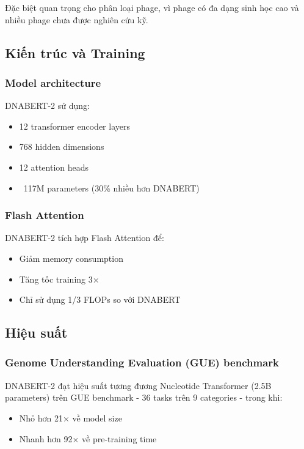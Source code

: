 Đặc biệt quan trọng cho phân loại phage, vì phage có đa dạng sinh học cao và nhiều phage chưa được nghiên cứu kỹ.

\subsection{Kiến trúc và Training}

\subsubsection{Model architecture}

DNABERT-2 sử dụng:
\begin{itemize}
    \item 12 transformer encoder layers
    \item 768 hidden dimensions
    \item 12 attention heads
    \item ~117M parameters (30\% nhiều hơn DNABERT)
\end{itemize}

\subsubsection{Flash Attention}

DNABERT-2 tích hợp Flash Attention \cite{dao2022flashattention} để:
\begin{itemize}
    \item Giảm memory consumption
    \item Tăng tốc training 3×
    \item Chỉ sử dụng 1/3 FLOPs so với DNABERT
\end{itemize}

\subsection{Hiệu suất}

\subsubsection{Genome Understanding Evaluation (GUE) benchmark}

DNABERT-2 đạt hiệu suất tương đương Nucleotide Transformer (2.5B parameters) trên GUE benchmark - 36 tasks trên 9 categories - trong khi:
\begin{itemize}
    \item Nhỏ hơn 21× về model size
    \item Nhanh hơn 92× về pre-training time
\end{itemize}

